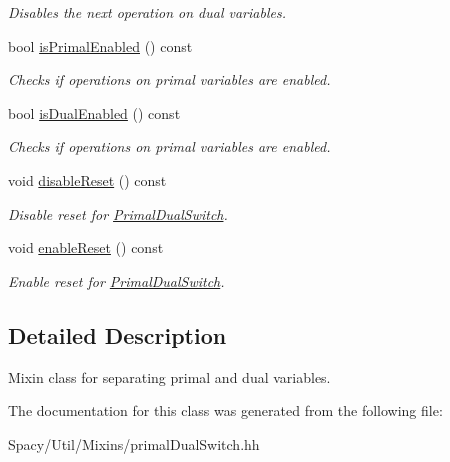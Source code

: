 \begin{DoxyCompactItemize}
\begin{DoxyCompactList}\small\item\em Disables the next operation on dual variables. \end{DoxyCompactList}\item 
\hypertarget{classSpacy_1_1Mixin_1_1PrimalDualSwitch_a2bf4b6817c958a3ec9aafac8fa7d3204}{}bool \hyperlink{classSpacy_1_1Mixin_1_1PrimalDualSwitch_a2bf4b6817c958a3ec9aafac8fa7d3204}{is\+Primal\+Enabled} () const \label{classSpacy_1_1Mixin_1_1PrimalDualSwitch_a2bf4b6817c958a3ec9aafac8fa7d3204}

\begin{DoxyCompactList}\small\item\em Checks if operations on primal variables are enabled. \end{DoxyCompactList}\item 
\hypertarget{classSpacy_1_1Mixin_1_1PrimalDualSwitch_ac4900bd28aaafd6edd46aecc7ec945f0}{}bool \hyperlink{classSpacy_1_1Mixin_1_1PrimalDualSwitch_ac4900bd28aaafd6edd46aecc7ec945f0}{is\+Dual\+Enabled} () const \label{classSpacy_1_1Mixin_1_1PrimalDualSwitch_ac4900bd28aaafd6edd46aecc7ec945f0}

\begin{DoxyCompactList}\small\item\em Checks if operations on primal variables are enabled. \end{DoxyCompactList}\item 
\hypertarget{classSpacy_1_1Mixin_1_1PrimalDualSwitch_a17fdb03a417a4aa78056a7f8d67b261d}{}void \hyperlink{classSpacy_1_1Mixin_1_1PrimalDualSwitch_a17fdb03a417a4aa78056a7f8d67b261d}{disable\+Reset} () const \label{classSpacy_1_1Mixin_1_1PrimalDualSwitch_a17fdb03a417a4aa78056a7f8d67b261d}

\begin{DoxyCompactList}\small\item\em Disable reset for \hyperlink{classSpacy_1_1Mixin_1_1PrimalDualSwitch}{Primal\+Dual\+Switch}. \end{DoxyCompactList}\item 
\hypertarget{classSpacy_1_1Mixin_1_1PrimalDualSwitch_a501ff6346350ca171c676ccff41e8f2e}{}void \hyperlink{classSpacy_1_1Mixin_1_1PrimalDualSwitch_a501ff6346350ca171c676ccff41e8f2e}{enable\+Reset} () const \label{classSpacy_1_1Mixin_1_1PrimalDualSwitch_a501ff6346350ca171c676ccff41e8f2e}

\begin{DoxyCompactList}\small\item\em Enable reset for \hyperlink{classSpacy_1_1Mixin_1_1PrimalDualSwitch}{Primal\+Dual\+Switch}. \end{DoxyCompactList}\end{DoxyCompactItemize}


\subsection{Detailed Description}
Mixin class for separating primal and dual variables. 

The documentation for this class was generated from the following file\+:\begin{DoxyCompactItemize}
\item 
Spacy/\+Util/\+Mixins/primal\+Dual\+Switch.\+hh\end{DoxyCompactItemize}
